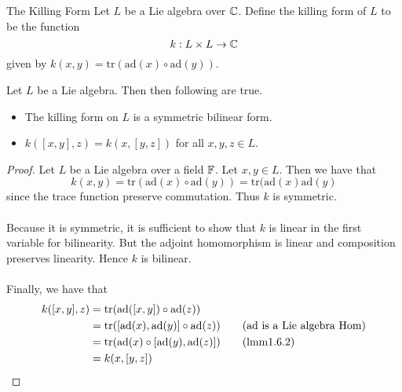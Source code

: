 \documentclass[a4paper]{article}
\begin{document}
\begin{defn}{The Killing Form}{} Let $L$ be a Lie algebra over $\mathbb{C}$. Define the killing form of $L$ to be the function $$k:L\times L\to\mathbb{C}$$ given by $k(x,y)=\text{tr}(\text{ad}(x)\circ\text{ad}(y))$. 
\end{defn}

\begin{lmm}{}{} Let $L$ be a Lie algebra. Then then following are true. 
\begin{itemize}
\item The killing form on $L$ is a symmetric bilinear form. 
\item $k([x,y],z)=k(x,[y,z])$ for all $x,y,z\in L$. 
\end{itemize} \tcbline
\begin{proof}
Let $L$ be a Lie algebra over a field $\mathbb{F}$. Let $x,y\in L$. Then we have that $$k(x,y)=\text{tr}(\text{ad}(x)\circ\text{ad}(y))=\text{tr}(\text{ad}(x)\text{ad}(y)$$ since the trace function preserve commutation. Thus $k$ is symmetric. \\~\\

Because it is symmetric, it is sufficient to show that $k$ is linear in the first variable for bilinearity. But the adjoint homomorphism is linear and composition preserves linearity. Hence $k$ is bilinear. \\~\\

Finally, we have that 
\begin{align*}
k([x,y],z)&=\text{tr}(\text{ad}([x,y])\circ\text{ad}(z))\\
&=\text{tr}([\text{ad}(x),\text{ad}(y)]\circ\text{ad}(z))\tag{$\text{ad}$ is a Lie algebra Hom}\\
&=\text{tr}(\text{ad}(x)\circ[\text{ad}(y),\text{ad}(z)])\tag{lmm1.6.2}\\
&=k(x,[y,z])
\end{align*}
\end{proof}
\end{lmm}
\end{document}
